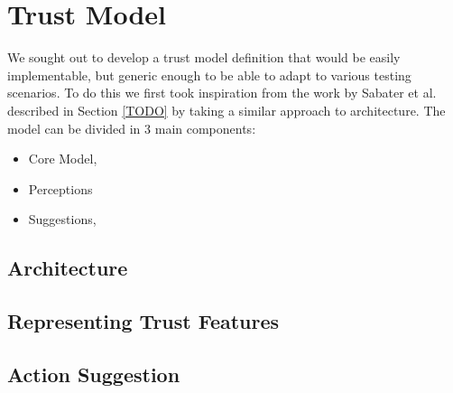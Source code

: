 
\section{Trust Model}
\label{sec:TrustModel}
We sought out to develop a trust model definition that would be easily implementable, but generic enough to be able to adapt to various testing scenarios. To do this we first took inspiration from the work by Sabater et al.\cite{Sabater2006} described in Section \ref{TODO} by taking a similar approach to architecture. The model can be divided in 3 main components:
\begin{itemize}
    \item Core Model, 
    \item Perceptions 
    \item Suggestions,
\end{itemize}

\subsection{Architecture}


% 

\subsection{Representing Trust Features}

\subsection{Action Suggestion}


